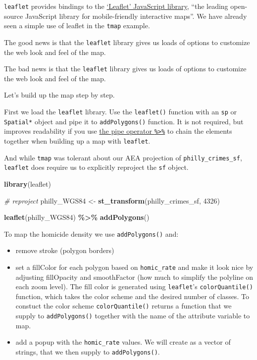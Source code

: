 \documentclass[
]{book}
\newenvironment{Shaded}{\begin{snugshade}}{\end{snugshade}}
\newcommand{\CommentTok}[1]{\textcolor[rgb]{0.56,0.35,0.01}{\textit{#1}}}
\newcommand{\DecValTok}[1]{\textcolor[rgb]{0.00,0.00,0.81}{#1}}
\newcommand{\FunctionTok}[1]{\textcolor[rgb]{0.13,0.29,0.53}{\textbf{#1}}}
\newcommand{\NormalTok}[1]{#1}
\newcommand{\OtherTok}[1]{\textcolor[rgb]{0.56,0.35,0.01}{#1}}
\newcommand{\SpecialCharTok}[1]{\textcolor[rgb]{0.81,0.36,0.00}{\textbf{#1}}}
\providecommand{\tightlist}{%
  \setlength{\itemsep}{0pt}\setlength{\parskip}{0pt}}
\begin{document}
\texttt{leaflet} provides bindings to the \href{http://leafletjs.com}{`Leaflet' JavaScript library}, ``the leading open-source JavaScript library for mobile-friendly interactive maps''. We have already seen a simple use of leaflet in the \texttt{tmap} example.

The good news is that the \texttt{leaflet} library gives us loads of options to customize the web look and feel of the map.

The bad news is that the \texttt{leaflet} library gives us loads of options to customize the web look and feel of the map.

Let's build up the map step by step.

First we load the \texttt{leaflet} library. Use the \texttt{leaflet()} function with an \texttt{sp} or \texttt{Spatial*} object and pipe it to \texttt{addPolygons()} function. It is not required, but improves readability if you use \href{https://github.com/tidyverse/magrittr}{the pipe operator \texttt{\%\textgreater{}\%}} to chain the elements together when building up a map with \texttt{leaflet}.

And while \texttt{tmap} was tolerant about our AEA projection of \texttt{philly\_crimes\_sf}, \texttt{leaflet} does require us to explicitly reproject the \texttt{sf} object.

\begin{Shaded}
\begin{Highlighting}[]
\FunctionTok{library}\NormalTok{(leaflet) }

\CommentTok{\# reproject}
\NormalTok{philly\_WGS84 }\OtherTok{\textless{}{-}} \FunctionTok{st\_transform}\NormalTok{(philly\_crimes\_sf, }\DecValTok{4326}\NormalTok{)}

\FunctionTok{leaflet}\NormalTok{(philly\_WGS84) }\SpecialCharTok{\%\textgreater{}\%}
  \FunctionTok{addPolygons}\NormalTok{()}
\end{Highlighting}
\end{Shaded}

To map the homicide density we use \texttt{addPolygons()} and:

\begin{itemize}
\tightlist
\item
  remove stroke (polygon borders)\\
\item
  set a fillColor for each polygon based on \texttt{homic\_rate} and make it look nice by adjusting fillOpacity and smoothFactor (how much to simplify the polyline on each zoom level). The fill color is generated using \texttt{leaflet}'s \texttt{colorQuantile()} function, which takes the color scheme and the desired number of classes. To constuct the color scheme \texttt{colorQuantile()} returns a function that we supply to \texttt{addPolygons()} together with the name of the attribute variable to map.\\
\item
  add a popup with the \texttt{homic\_rate} values. We will create as a vector of strings, that we then supply to \texttt{addPolygons()}.
\end{itemize}
\end{document}
